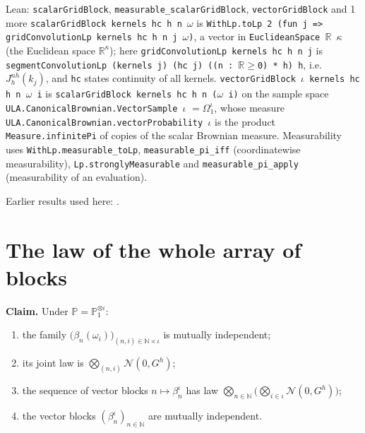 \documentclass[11pt,a4paper]{article}
\begin{document}
\begin{leanbox}{Lean: \texttt{scalarGridBlock}, \texttt{measurable\_\allowbreak{}scalarGridBlock}, \texttt{vectorGridBlock} and 1 more}
\texttt{scalar\allowbreak{}Grid\allowbreak{}Block kernels hc h n \ensuremath{\omega}} is \texttt{With\allowbreak{}Lp.\allowbreak{}to\allowbreak{}Lp 2 (fun j => grid\allowbreak{}Convolution\allowbreak{}Lp kernels hc h n j \ensuremath{\omega})}, a vector in \texttt{Euclidean\allowbreak{}Space \ensuremath{\mathbb R} \ensuremath{\kappa}} (the Euclidean space \(\mathbb R^\kappa\)); here \texttt{grid\allowbreak{}Convolution\allowbreak{}Lp kernels hc h n j} is \texttt{segment\allowbreak{}Convolution\allowbreak{}Lp (kernels j) (hc j) ((n : \ensuremath{\mathbb R}\ensuremath{\ge}0) * h) h}, i.e. \(J^{nh}_h(k_j)\), and \texttt{hc} states continuity of all kernels. \texttt{vector\allowbreak{}Grid\allowbreak{}Block \ensuremath{\iota} kernels hc h n \ensuremath{\omega} i} is \texttt{scalar\allowbreak{}Grid\allowbreak{}Block kernels hc h n (\ensuremath{\omega} i)} on the sample space \texttt{ULA.\allowbreak{}Canonical\allowbreak{}Brownian.\allowbreak{}Vector\allowbreak{}Sample \ensuremath{\iota}} \(=\Omega_1^\iota\), whose measure \texttt{ULA.\allowbreak{}Canonical\allowbreak{}Brownian.\allowbreak{}vector\allowbreak{}Probability \ensuremath{\iota}} is the product \texttt{Measure.\allowbreak{}infinite\allowbreak{}Pi} of copies of the scalar Brownian measure. Measurability uses \texttt{With\allowbreak{}Lp.\allowbreak{}measurable\_\allowbreak{}to\allowbreak{}Lp}, \texttt{measurable\_\allowbreak{}pi\_\allowbreak{}iff} (coordinatewise measurability), \texttt{Lp.\allowbreak{}strongly\allowbreak{}Measurable} and \texttt{measurable\_\allowbreak{}pi\_\allowbreak{}apply} (measurability of an evaluation).
\end{leanbox}


Earlier results used here: \cite[Section~3.8.16]{LangevinLean2026ULASC}.

\section{\texorpdfstring{The law of the whole array of blocks}{The law of the whole array of blocks}}


\textbf{Claim.} Under \(\mathbb P=\mathbb P_1^{\otimes\iota}\):



\begin{enumerate}


\item the family \(\bigl(\beta_n(\omega_i)\bigr)_{(n,i)\in\mathbb N\times\iota}\) is mutually independent;

\item its joint law is \(\bigotimes_{(n,i)}\mathcal N(0,G^h)\);

\item the sequence of vector blocks \(n\mapsto\beta^\iota_n\) has law \(\bigotimes_{n\in\mathbb N}\bigl(\bigotimes_{i\in\iota}\mathcal N(0,G^h)\bigr)\);

\item the vector blocks \((\beta^\iota_n)_{n\in\mathbb N}\) are mutually independent.

\end{enumerate}
\end{document}
